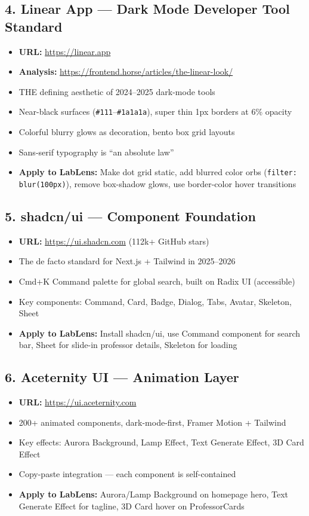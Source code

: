 \documentclass[11pt,letterpaper]{article}
\begin{document}
\subsection{4. Linear App --- Dark Mode Developer Tool Standard}
\begin{itemize}[nosep]
    \item \textbf{URL:} \url{https://linear.app}
    \item \textbf{Analysis:} \url{https://frontend.horse/articles/the-linear-look/}
    \item THE defining aesthetic of 2024--2025 dark-mode tools
    \item Near-black surfaces (\texttt{\#111}--\texttt{\#1a1a1a}), super thin 1px borders at 6\% opacity
    \item Colorful blurry glows as decoration, bento box grid layouts
    \item Sans-serif typography is ``an absolute law''
    \item \textbf{Apply to LabLens:} Make dot grid static, add blurred color orbs (\texttt{filter: blur(100px)}), remove box-shadow glows, use border-color hover transitions
\end{itemize}

\subsection{5. shadcn/ui --- Component Foundation}
\begin{itemize}[nosep]
    \item \textbf{URL:} \url{https://ui.shadcn.com} (112k+ GitHub stars)
    \item The de facto standard for Next.js + Tailwind in 2025--2026
    \item Cmd+K Command palette for global search, built on Radix UI (accessible)
    \item Key components: Command, Card, Badge, Dialog, Tabs, Avatar, Skeleton, Sheet
    \item \textbf{Apply to LabLens:} Install shadcn/ui, use Command component for search bar, Sheet for slide-in professor details, Skeleton for loading
\end{itemize}

\subsection{6. Aceternity UI --- Animation Layer}
\begin{itemize}[nosep]
    \item \textbf{URL:} \url{https://ui.aceternity.com}
    \item 200+ animated components, dark-mode-first, Framer Motion + Tailwind
    \item Key effects: Aurora Background, Lamp Effect, Text Generate Effect, 3D Card Effect
    \item Copy-paste integration --- each component is self-contained
    \item \textbf{Apply to LabLens:} Aurora/Lamp Background on homepage hero, Text Generate Effect for tagline, 3D Card hover on ProfessorCards
\end{itemize}
\end{document}
